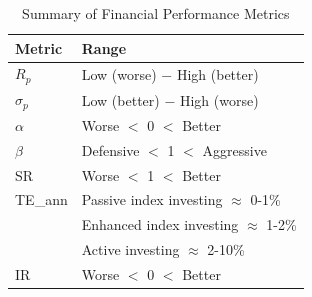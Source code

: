 \begin{table}[H]
\centering
\footnotesize
\begin{tabularx}{0.5\textwidth}{lX}
\hline
Metric & Range \\
\hline
$R_p$           & Low (worse) $-$ High (better)             \\
$\sigma_p$      & Low (better) $-$ High (worse)             \\
$\alpha$        & Worse $\less$ 0 $\less$ Better            \\
$\beta$         & Defensive $<$ 1 $<$ Aggressive             \\
SR              & Worse $<$ 1 $<$ Better                    \\
TE_{ann}        & Passive index investing $\approx$ 0-1\%   \\ 
                & Enhanced index investing $\approx$ 1-2\%  \\
                & Active investing $\approx$ 2-10\%         \\
IR              & Worse $\less$ 0 $\less$ Better            \\
\hline
\end{tabularx}
\vspace{1em}
\caption{{Summary of Financial Performance Metrics}}
\label{tab:metrics-ranges-implications}
\end{table}
